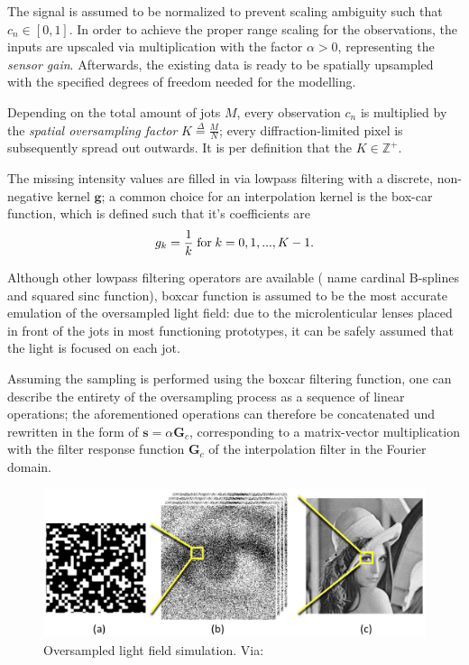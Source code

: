The signal is assumed to be normalized to prevent scaling ambiguity such that $c_n \in [0,1]$. In order to achieve the proper range scaling for the observations, the inputs are upscaled via multiplication with the factor $\alpha > 0$, representing the \textit{sensor gain}. Afterwards, the existing data is ready to be spatially upsampled with the specified degrees of freedom needed for the modelling. 

Depending on the total amount of jots $M$, every observation $c_n$ is multiplied by the \textit{spatial oversampling factor} $ K \stackrel{\Delta}{=} \frac{M}{N} $; every diffraction-limited pixel is subsequently spread out outwards. It is per definition that the $K \in \mathbb{Z}^{+} $.

The missing intensity values are filled in via lowpass filtering with a discrete, non-negative kernel $\boldsymbol{g}$; a common choice for an interpolation kernel is the box-car function, which is defined such that it's coefficients are
\begin{equation}g_k = \frac{1}{k} \;\textup{for} \;k = 0, 1, ... , K-1.\end{equation}

Although other lowpass filtering operators are available (\cite{Feng_Yang_2012} name cardinal B-splines and squared sinc function), boxcar function is assumed to be the most accurate emulation of the oversampled light field: due to the microlenticular lenses placed in front of the jots in most functioning prototypes, it can be safely assumed that the light is focused on each jot.\cite{qisthreshold}

Assuming the sampling is performed using the box\-car filtering function, one can describe the entirety of the oversampling process as a sequence of linear operations; the aforementioned operations can therefore be concatenated und rewritten in the form of $\boldsymbol{s} = \alpha \boldsymbol{G}_c $, corresponding to a matrix-vector multiplication with the filter response function $\boldsymbol{G}_c$ of the interpolation filter in the Fourier domain.

\begin{figure}[h]
  \centering
  \includegraphics[width=0.8\linewidth]{imgs/qis/jotdatasimulation.png}
  \caption{Oversampled light field simulation. Via: \cite{fossum2016quanta}}
  \label{fig:jotdata}
\end{figure}

